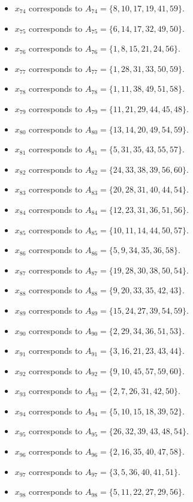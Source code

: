 \documentclass[11pt]{article}
\begin{document}
\begin{itemize}
\item $x_{74}$ corresponds to $A_{74}=\{8, 10, 17, 19, 41, 59\}$.
\item $x_{75}$ corresponds to $A_{75}=\{6, 14, 17, 32, 49, 50\}$.
\item $x_{76}$ corresponds to $A_{76}=\{1, 8, 15, 21, 24, 56\}$.
\item $x_{77}$ corresponds to $A_{77}=\{1, 28, 31, 33, 50, 59\}$.
\item $x_{78}$ corresponds to $A_{78}=\{1, 11, 38, 49, 51, 58\}$.
\item $x_{79}$ corresponds to $A_{79}=\{11, 21, 29, 44, 45, 48\}$.
\item $x_{80}$ corresponds to $A_{80}=\{13, 14, 20, 49, 54, 59\}$.
\item $x_{81}$ corresponds to $A_{81}=\{5, 31, 35, 43, 55, 57\}$.
\item $x_{82}$ corresponds to $A_{82}=\{24, 33, 38, 39, 56, 60\}$.
\item $x_{83}$ corresponds to $A_{83}=\{20, 28, 31, 40, 44, 54\}$.
\item $x_{84}$ corresponds to $A_{84}=\{12, 23, 31, 36, 51, 56\}$.
\item $x_{85}$ corresponds to $A_{85}=\{10, 11, 14, 44, 50, 57\}$.
\item $x_{86}$ corresponds to $A_{86}=\{5, 9, 34, 35, 36, 58\}$.
\item $x_{87}$ corresponds to $A_{87}=\{19, 28, 30, 38, 50, 54\}$.
\item $x_{88}$ corresponds to $A_{88}=\{9, 20, 33, 35, 42, 43\}$.
\item $x_{89}$ corresponds to $A_{89}=\{15, 24, 27, 39, 54, 59\}$.
\item $x_{90}$ corresponds to $A_{90}=\{2, 29, 34, 36, 51, 53\}$.
\item $x_{91}$ corresponds to $A_{91}=\{3, 16, 21, 23, 43, 44\}$.
\item $x_{92}$ corresponds to $A_{92}=\{9, 10, 45, 57, 59, 60\}$.
\item $x_{93}$ corresponds to $A_{93}=\{2, 7, 26, 31, 42, 50\}$.
\item $x_{94}$ corresponds to $A_{94}=\{5, 10, 15, 18, 39, 52\}$.
\item $x_{95}$ corresponds to $A_{95}=\{26, 32, 39, 43, 48, 54\}$.
\item $x_{96}$ corresponds to $A_{96}=\{2, 16, 35, 40, 47, 58\}$.
\item $x_{97}$ corresponds to $A_{97}=\{3, 5, 36, 40, 41, 51\}$.
\item $x_{98}$ corresponds to $A_{98}=\{5, 11, 22, 27, 29, 56\}$.

\end{itemize}
\end{document}
